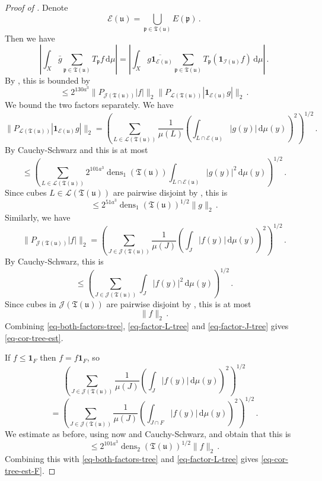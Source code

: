 \documentclass[10pt,a4paper]{article}
\theoremstyle{plain}
\theoremstyle{definition}
\numberwithin{equation}{subsection}
\DeclareMathOperator{\dens}{\operatorname{dens}}
\newcommand{\fp}{{\mathfrak p}}
\newcommand{\fu}{{\mathfrak u}}
\newcommand{\fT}{{\mathfrak T}}
\newcommand{\scI}{{\mathcal{I}}} %
\begin{document}
\begin{proof}[Proof of ]
    Denote
    $$
        \mathcal{E}(\fu) = \bigcup_{\fp \in \fT(\fu)} E(\fp)\,.
    $$
    Then we have
    $$
        \left| \int_X \bar g \sum_{\fp \in \fT(\fu)} T_{\fp} f \, \mathrm{d}\mu \right| = \left| \int_X \overline{ g\mathbf{1}_{\mathcal{E}(\fu)}} \sum_{\fp \in \fT(\fu)} T_{\fp} (\mathbf{1}_{\scI(\fu)}f) \, \mathrm{d}\mu \right|\,.
    $$
    By , this is bounded by
    \begin{equation}
        \label{eq-both-factors-tree}
        \le 2^{130a^3}\|P_{\mathcal{J}(\fT(\fu))}|f|\|_2 \|P_{\mathcal{L}(\fT(\fu))} |\mathbf{1}_{\mathcal{E}(\fu)}g|\|_2\,.
    \end{equation}
    We bound the two factors separately.
    We have
    $$
        \|P_{\mathcal{L}(\fT(\fu))} |\mathbf{1}_{\mathcal{E}(\fu)}g|\|_2 = \left( \sum_{L \in \mathcal{L}(\fT(\fu))} \frac{1}{\mu(L)} \left(\int_{L \cap \mathcal{E}(\fu)} |g(y)| \, \mathrm{d}\mu(y)\right)^2 \right)^{1/2}\,.
    $$
    By Cauchy-Schwarz and  this is at most
    $$
        \le \left( \sum_{L \in \mathcal{L}(\fT(\fu))} 2^{101a^3} \dens_1(\fT(\fu)) \int_{L \cap \mathcal{E}(\fu)} |g(y)|^2 \, \mathrm{d}\mu(y) \right)^{1/2}\,.
    $$
    Since cubes $L \in \mathcal{L}(\fT(\fu))$ are pairwise disjoint by , this is
    \begin{equation}
        \label{eq-factor-L-tree}
         \le 2^{51 a^3} \dens_1(\fT(\fu))^{1/2} \|g\|_2\,.
    \end{equation}
    Similarly, we have
    \begin{equation}
        \label{eq-cor-tree-proof}
        \|P_{\mathcal{J}(\fT(\fu))}|f|\|_2 = \left( \sum_{J \in \mathcal{J}(\fT(\fu))} \frac{1}{\mu(J)} \left(\int_J |f(y)| \, \mathrm{d}\mu(y)\right)^2 \right)^{1/2}\,.
    \end{equation}
    By Cauchy-Schwarz, this is
    $$
        \le \left( \sum_{J \in \mathcal{J}(\fT(\fu))} \int_J |f(y)|^2 \, \mathrm{d}\mu(y) \right)^{1/2}\,.
    $$
    Since cubes in $\mathcal{J}(\fT(\fu))$ are pairwise disjoint by , this is at most
    \begin{equation}
        \label{eq-factor-J-tree}
        \|f\|_2\,.
    \end{equation}
    Combining \eqref{eq-both-factors-tree}, \eqref{eq-factor-L-tree} and \eqref{eq-factor-J-tree} gives \eqref{eq-cor-tree-est}.

    If $f \le \mathbf{1}_F$ then $f = f\mathbf{1}_F$, so
    $$
        \left( \sum_{J \in \mathcal{J}(\fT(\fu))} \frac{1}{\mu(J)} \left(\int_J |f(y)| \, \mathrm{d}\mu(y)\right)^2 \right)^{1/2}
    $$
    $$
        =\left(\sum_{J \in \mathcal{J}(\fT(\fu))} \frac{1}{\mu(J)} \left(\int_{J \cap F} |f(y)| \, \mathrm{d}\mu(y)\right)^2 \right)^{1/2}\,.
    $$
    We estimate as before, using now  and Cauchy-Schwarz, and obtain that this is
    $$
        \le 2^{101a^3} \dens_2(\fT(\fu))^{1/2} \|f\|_2\,.
    $$
    Combining this with \eqref{eq-both-factors-tree} and \eqref{eq-factor-L-tree} gives \eqref{eq-cor-tree-est-F}.
\end{proof}
\end{document}
